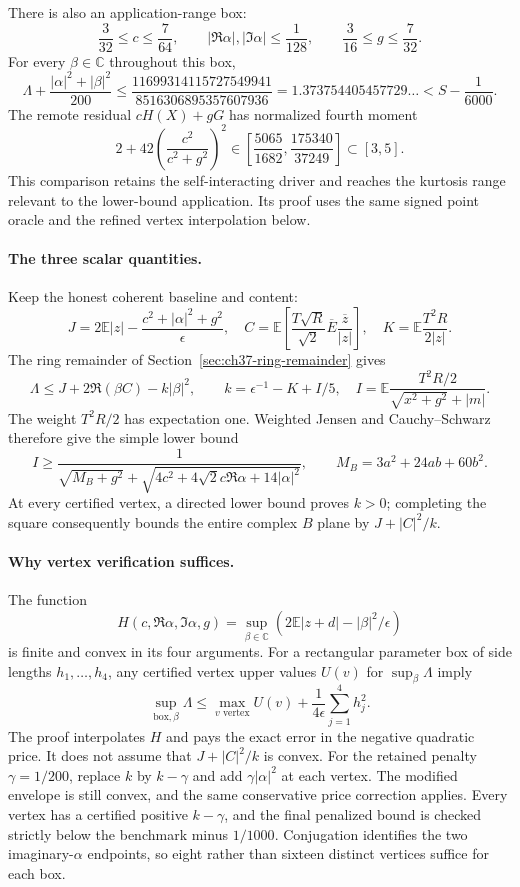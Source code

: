 There is also an application-range box:
\[
 \frac3{32}\le c\le\frac7{64},\qquad
 |\Re\alpha|,|\Im\alpha|\le\frac1{128},\qquad
 \frac3{16}\le g\le\frac7{32}.
\]
For every $\beta\in\mathbb C$ throughout this box,
\[
 \Lambda+\frac{|\alpha|^2+|\beta|^2}{200}
 \le\frac{11699314115727549941}{8516306895357607936}
 =1.373754405457729\ldots<S-\frac1{6000}.
\]
The remote residual $cH(X)+gG$ has normalized fourth moment
\[
 2+42\left(\frac{c^2}{c^2+g^2}\right)^2
 \in\left[\frac{5065}{1682},\frac{175340}{37249}\right]
 \subset[3,5].
\]
This comparison retains the self-interacting driver and reaches the
kurtosis range relevant to the lower-bound application. Its proof uses
the same signed point oracle and the refined vertex interpolation below.

\paragraph{The three scalar quantities.}
Keep the honest coherent baseline and content:
\[
 J=2\mathbb E|z|-\frac{c^2+|\alpha|^2+g^2}{\epsilon},\quad
 C=\mathbb E\left[\frac{T\sqrt R}{\sqrt2}\overline E
                       \frac{\overline z}{|z|}\right],\quad
 K=\mathbb E\frac{T^2R}{2|z|}.
\]
The ring remainder of Section~\ref{sec:ch37-ring-remainder} gives
\[
 \Lambda\le J+2\Re(\beta C)-k|\beta|^2,\qquad
 k=\epsilon^{-1}-K+I/5,
\quad
 I=\mathbb E\frac{T^2R/2}{\sqrt{x^2+g^2}+|m|}.
\]
The weight $T^2R/2$ has expectation one. Weighted Jensen and
Cauchy--Schwarz therefore give the simple lower bound
\[
 I\ge\frac1{\sqrt{M_B+g^2}+
 \sqrt{4c^2+4\sqrt2c\Re\alpha+14|\alpha|^2}},\qquad
 M_B=3a^2+24ab+60b^2.
\]
At every certified vertex, a directed lower bound proves $k>0$;
completing the square consequently bounds the entire complex $B$ plane
by $J+|C|^2/k$.

\paragraph{Why vertex verification suffices.}
The function
\[
 H(c,\Re\alpha,\Im\alpha,g)
 =\sup_{\beta\in\mathbb C}
 \left(2\mathbb E|z+d|-|\beta|^2/\epsilon\right)
\]
is finite and convex in its four arguments. For a rectangular parameter
box of side lengths $h_1,\ldots,h_4$, any certified vertex upper values
$U(v)$ for $\sup_\beta\Lambda$ imply
\[
 \sup_{\text{box},\beta}\Lambda
 \le\max_{v\text{ vertex}}U(v)+\frac1{4\epsilon}\sum_{j=1}^4h_j^2.
\]
The proof interpolates $H$ and pays the exact error in the negative
quadratic price. It does not assume that $J+|C|^2/k$ is convex.
For the retained penalty $\gamma=1/200$, replace $k$ by $k-\gamma$
and add $\gamma|\alpha|^2$ at each vertex. The modified envelope is
still convex, and the same conservative price correction applies. Every
vertex has a certified positive $k-\gamma$, and the final penalized
bound is checked strictly below the benchmark minus $1/1000$.
Conjugation identifies the two imaginary-$\alpha$ endpoints, so eight
rather than sixteen distinct vertices suffice for each box.

